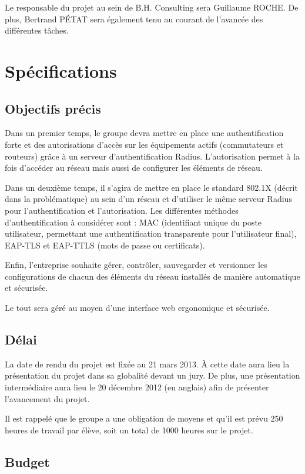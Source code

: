 Le responsable du projet au sein de B.H. Consulting sera Guillaume ROCHE. De plus, Bertrand PÉTAT sera également tenu au courant de l'avancée des différentes tâches.

\section{Spécifications}
\subsection{Objectifs précis}

Dans un premier temps, le groupe devra mettre en place une authentification forte et des autorisations d'accès sur les équipements actifs (commutateurs et routeurs) grâce à un serveur d'authentification Radius. L'autorisation permet à la fois d'accéder au réseau mais aussi de configurer les éléments de réseau.

Dans un deuxième temps, il s'agira de mettre en place le standard 802.1X (décrit dans la problématique) au sein d'un réseau et d'utiliser le même serveur Radius pour l'authentification et l'autorisation. Les différentes méthodes d'authentification à considérer sont : MAC (identifiant unique du poste utilisateur, permettant une authentification transparente pour l'utilisateur final), EAP-TLS et EAP-TTLS (mots de passe ou certificats).

Enfin, l'entreprise souhaite gérer, contrôler, sauvegarder et versionner les configurations de chacun des éléments du réseau installés de manière automatique et sécurisée.

Le tout sera géré au moyen d'une interface web ergonomique et sécurisée.

\subsection{Délai}

La date de rendu du projet est fixée au 21 mars 2013. À cette date aura lieu la présentation du projet dans sa globalité devant un jury. De plus, une présentation intermédiaire aura lieu le 20 décembre 2012 (en anglais) afin de présenter l'avancement du projet.

Il est rappelé que le groupe a une obligation de moyens et qu'il est prévu 250 heures de travail par élève, soit un total de 1000 heures sur le projet.

\subsection{Budget}

